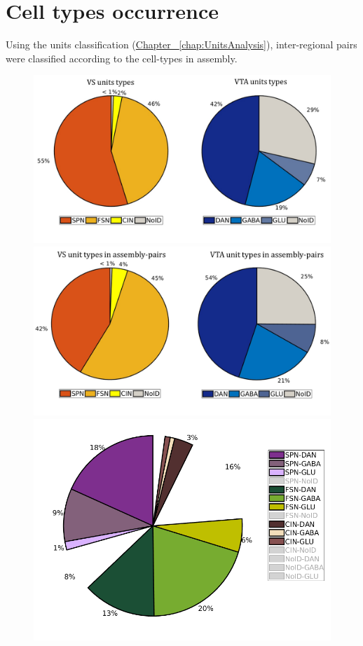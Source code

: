 \section{Cell types occurrence}
\label{sec:CellTypesOcc}
Using the units classification (\hyperref[chap:UnitsAnalysis]{Chapter~ \ref*{chap:UnitsAnalysis}}), inter-regional pairs were classified according to the cell-types in assembly. 
\begin{figure}[H]
    \centering
    \includegraphics[scale=0.35]{figures/PieRegions1.pdf}
    \includegraphics[scale=0.35]{figures/PieAsNotAs.pdf}
    \includegraphics[scale=0.35]{figures/PieAssembliesTot1.png}

\end{figure}
